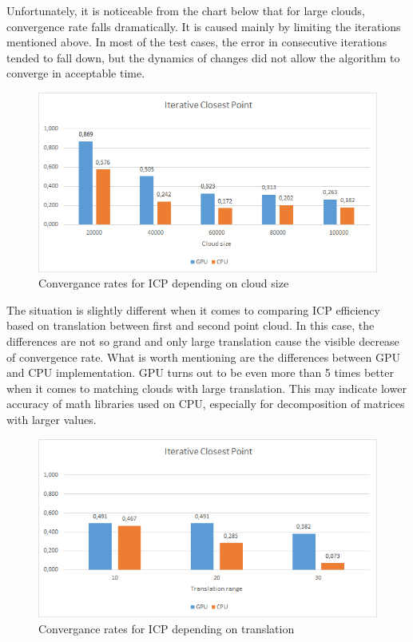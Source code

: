 \documentclass[titlepage]{article}
\begin{document}
Unfortunately, it is noticeable from the chart below that for large clouds, convergence rate falls dramatically. It is caused mainly by limiting the iterations mentioned above. In most of the test cases, the error in consecutive iterations tended to fall down, but the dynamics of changes did not allow the algorithm to converge in acceptable time.
\begin{figure}[H]
\includegraphics[width=\textwidth]{ss-icp-1.png}
\caption{Convergance rates for ICP depending on cloud size}
\end{figure}
The situation is slightly different when it comes to comparing ICP efficiency based on translation between first and second point cloud. In this case, the differences are not so grand and only large translation cause the visible decrease of convergence rate. What is worth mentioning are the differences between GPU and CPU implementation. GPU turns out to be even more than 5 times better when it comes to matching clouds with large translation. This may indicate lower accuracy of math libraries used on CPU, especially for decomposition of matrices with larger values. 
\begin{figure}[H]
\includegraphics[width=\textwidth]{ss-icp-2.png}
\caption{Convergance rates for ICP depending on translation}
\end{figure}
\end{document}
